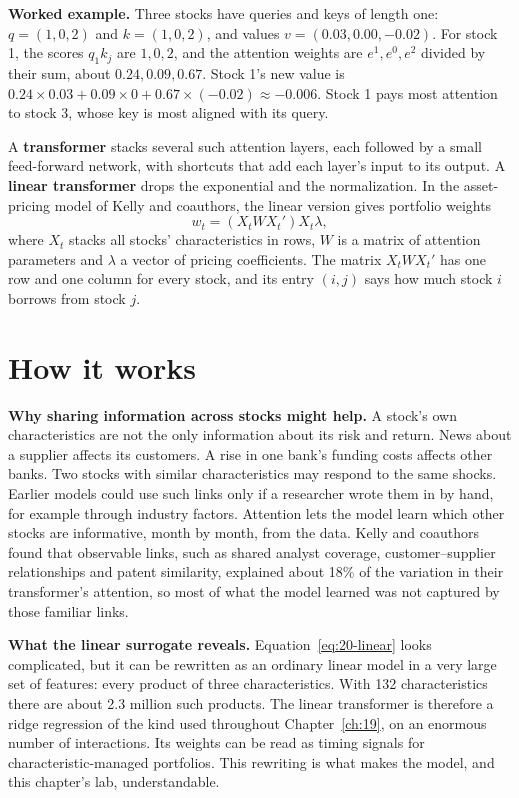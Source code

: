 \textbf{Worked example.} Three stocks have queries and keys of length one: $q = (1, 0, 2)$ and $k = (1, 0, 2)$, and values $v = (0.03, 0.00, -0.02)$. For stock 1, the scores $q_1 k_j$ are $1, 0, 2$, and the attention weights are $e^1, e^0, e^2$ divided by their sum, about $0.24, 0.09, 0.67$. Stock 1's new value is $0.24 \times 0.03 + 0.09 \times 0 + 0.67 \times (-0.02) \approx -0.006$. Stock 1 pays most attention to stock 3, whose key is most aligned with its query.

A \textbf{transformer} stacks several such attention layers, each followed by a small feed-forward network, with shortcuts that add each layer's input to its output. A \textbf{linear transformer} drops the exponential and the normalization. In the asset-pricing model of Kelly and coauthors, the linear version gives portfolio weights
\begin{equation}
  w_t = \left(X_t W X_t'\right) X_t \lambda,
  \label{eq:20-linear}
\end{equation}
where $X_t$ stacks all stocks' characteristics in rows, $W$ is a matrix of attention parameters and $\lambda$ a vector of pricing coefficients. The matrix $X_t W X_t'$ has one row and one column for every stock, and its entry $(i,j)$ says how much stock $i$ borrows from stock $j$.

\section{How it works}
\label{sec:20-how}

\textbf{Why sharing information across stocks might help.} A stock's own characteristics are not the only information about its risk and return. News about a supplier affects its customers. A rise in one bank's funding costs affects other banks. Two stocks with similar characteristics may respond to the same shocks. Earlier models could use such links only if a researcher wrote them in by hand, for example through industry factors. Attention lets the model learn which other stocks are informative, month by month, from the data. Kelly and coauthors found that observable links, such as shared analyst coverage, customer--supplier relationships and patent similarity, explained about 18\% of the variation in their transformer's attention, so most of what the model learned was not captured by those familiar links.

\textbf{What the linear surrogate reveals.} Equation~\eqref{eq:20-linear} looks complicated, but it can be rewritten as an ordinary linear model in a very large set of features: every product of three characteristics. With 132 characteristics there are about 2.3 million such products. The linear transformer is therefore a ridge regression of the kind used throughout Chapter~\ref{ch:19}, on an enormous number of interactions. Its weights can be read as timing signals for characteristic-managed portfolios. This rewriting is what makes the model, and this chapter's lab, understandable.

